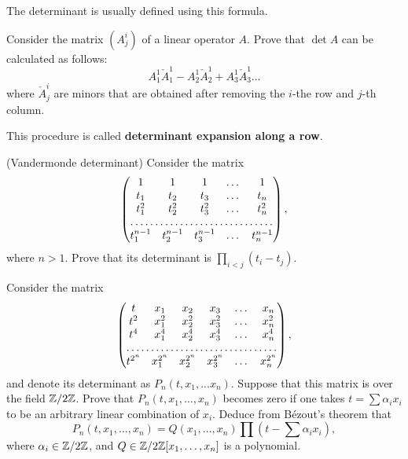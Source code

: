 \documentclass[12pt]{article}
\begin{document}
\begin{zamechanie} 
The determinant is usually defined using this formula.
\end{zamechanie}

\begin{zadacha}
Consider the matrix $(A^i_j)$ of a linear operator $A$.
Prove that $\det A$ can be calculated as follows:
\[
A^1_1 \check A^1_1 - A^1_2\check A^1_2 + A^1_3\check A^1_3 \dots
\]
where $\check A^i_j$ are minors that are obtained after removing the 
$i$-the row and $j$-th column.
\end{zadacha}

\begin{zamechanie}
This procedure is called {\bf determinant expansion along a row}.
\end{zamechanie}

\begin{zadacha}[*]
(Vandermonde determinant)
Consider the matrix
$$
\begin{pmatrix}
1 &1 &1 &\dots &1\\
t_1 &t_2 &t_3 &\dots &t_n\\
t_1^2 &t_2^2 &t_3^2 &\dots &t_n^2\\
\hdotsfor{5}\\
t_1^{n-1} &t_2^{n-1} &t_3^{n-1} &\dots &t_n^{n-1}
\end{pmatrix},
$$
where $n>1$. Prove that its determinant is
$\prod_{i<j} (t_i-t_j)$.
\end{zadacha}

\begin{zadacha}[*]\label{_P_prod_Q_i_kornej_Zadacha_}
Consider the matrix
$$
\begin{pmatrix}
t &x_1 &x_2 &x_3 &\dots &x_n\\
t^2 &x_1^2 &x_2^2 &x_3^2 &\dots &x_n^2\\
t^4 &x_1^4 &x_2^4 &x_3^4 &\dots &x_n^4\\
\hdotsfor{6}\\
t^{2^{n}} &x_1^{2^{n}} &x_2^{2^{n}} &x_3^{2^{n}} &\dots &x_n^{2^{n}}
\end{pmatrix},
$$
and denote its determinant as $P_n(t, x_1, ... x_n)$. Suppose that
this matrix is over the field ${\mathbb Z}/2{\mathbb Z}$. Prove that $P_n(t, x_1, \dots,
x_n)$ becomes zero if one takes $t=\sum \alpha_i x_i$
to be an arbitrary linear combination of $x_i$. Deduce from B\'ezout's
theorem that
\[ 
 P_n(t, x_1, \dots, x_n) = Q(x_1, \dots, x_n)\prod (t-\sum
 \alpha_i x_i),
\]
where $\alpha_i\in {\mathbb Z}/2{\mathbb Z}$, and $Q \in {\mathbb Z}/2{\mathbb Z}[x_1, \dots, x_n]$ is a
polynomial. 
\end{zadacha}
\end{document}
